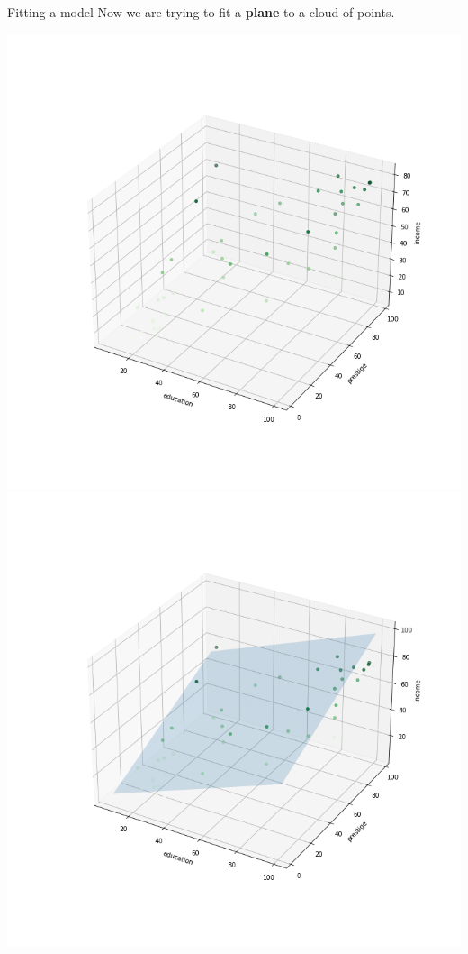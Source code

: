 \documentclass[
  ignorenonframetext,
  aspectratio=169,
]{beamer}
\begin{document}
\begin{frame}
\begin{block}{Fitting a model}
\protect\hypertarget{fitting-a-model}{}
Now we are trying to fit a \textbf{plane} to a cloud of points.

\includegraphics{graphs/empty_data.png}
\includegraphics{graphs/2d_regression.png}
\end{block}
\end{frame}
\end{document}
